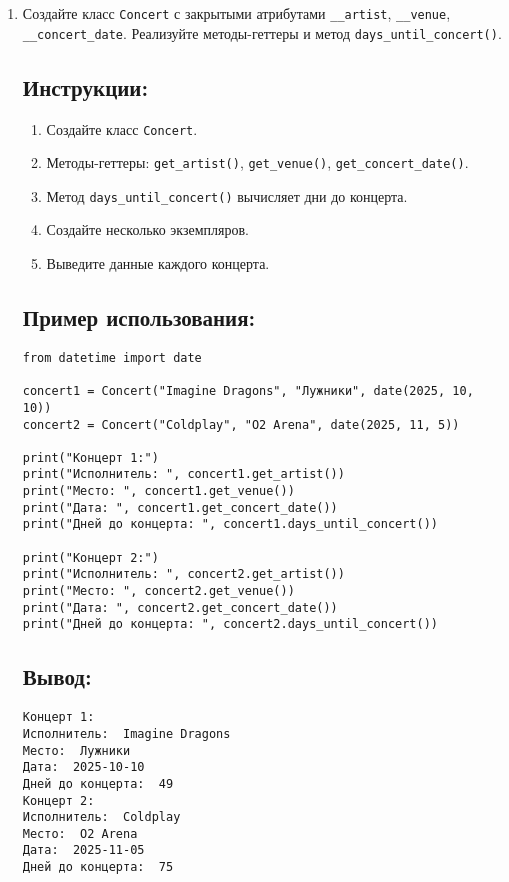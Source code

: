 \begin{enumerate}
\item
Создайте класс \texttt{Concert} с закрытыми атрибутами \texttt{\_\_artist}, \texttt{\_\_venue}, \texttt{\_\_concert\_date}. Реализуйте методы-геттеры и метод \texttt{days\_until\_concert()}.

\subsection*{Инструкции:}
\begin{enumerate}
    \item Создайте класс \texttt{Concert}.
    \item Методы-геттеры: \texttt{get\_artist()}, \texttt{get\_venue()}, \texttt{get\_concert\_date()}.
    \item Метод \texttt{days\_until\_concert()} вычисляет дни до концерта.
    \item Создайте несколько экземпляров.
    \item Выведите данные каждого концерта.
\end{enumerate}

\subsection*{Пример использования:}
\begin{lstlisting}[caption=Пример кода]
from datetime import date

concert1 = Concert("Imagine Dragons", "Лужники", date(2025, 10, 10))
concert2 = Concert("Coldplay", "O2 Arena", date(2025, 11, 5))

print("Концерт 1:")
print("Исполнитель: ", concert1.get_artist())
print("Место: ", concert1.get_venue())
print("Дата: ", concert1.get_concert_date())
print("Дней до концерта: ", concert1.days_until_concert())

print("Концерт 2:")
print("Исполнитель: ", concert2.get_artist())
print("Место: ", concert2.get_venue())
print("Дата: ", concert2.get_concert_date())
print("Дней до концерта: ", concert2.days_until_concert())
\end{lstlisting}

\subsection*{Вывод:}
\begin{lstlisting}[caption=Ожидаемый вывод]
Концерт 1:
Исполнитель:  Imagine Dragons
Место:  Лужники
Дата:  2025-10-10
Дней до концерта:  49
Концерт 2:
Исполнитель:  Coldplay
Место:  O2 Arena
Дата:  2025-11-05
Дней до концерта:  75
\end{lstlisting}


\end{enumerate}
